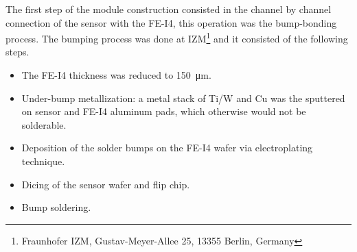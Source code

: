 The first step of the module construction consisted in the channel by channel connection of the sensor with the FE-I4, this operation was the bump-bonding process.
The bumping process was done at IZM\footnote{Fraunhofer IZM, Gustav-Meyer-Allee 25, 13355 Berlin, Germany} and it consisted  of the following steps.
\begin{itemize}
\item The FE-I4 thickness was reduced to \SI{150}{\micro\meter}.
\item Under-bump metallization: a metal stack of Ti/W and Cu was the sputtered on sensor and FE-I4 aluminum pads, which otherwise would not be solderable.
\item Deposition of the solder bumps on the FE-I4 wafer via electroplating technique.
\item Dicing of the sensor wafer and flip chip.
\item Bump soldering.
\end{itemize}



